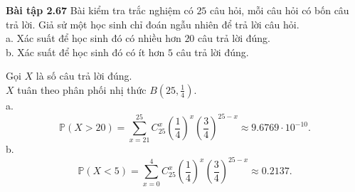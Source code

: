 \documentclass[12pt,a4paper]{article}
\begin{document}
\begin{mybox}
\textbf{Bài tập 2.67} Bài kiểm tra trắc nghiệm có $25$ câu hỏi, mỗi câu hỏi có bốn câu trả lời. Giả sử một học sinh chỉ đoán ngẫu nhiên để trả lời câu hỏi.\\
a. Xác suất để học sinh đó có nhiều hơn $20$ câu trả lời đúng.\\
b. Xác suất để học sinh đó có ít hơn $5$ câu trả lời đúng.\\
\end{mybox}
Gọi $X$ là số câu trả lời đúng.\\
$X$ tuân theo phân phối nhị thức $B \left( {25, \frac{1}{4}} \right).$\\
a. $$\mathbb{P} \left( {X > 20} \right) = \sum\limits_{x = 21}^{25} {C_{25}^x \left( {\frac{1}{4}} \right)^{x} \left( {\frac{3}{4}} \right)^{25 - x}} \approx 9.6769 \cdot 10^{-10}.$$
b. $$\mathbb{P} \left( {X < 5} \right) = \sum\limits_{x = 0}^{4} {C_{25}^x \left( {\frac{1}{4}} \right)^{x} \left( {\frac{3}{4}} \right)^{25 - x}} \approx 0.2137.$$
\end{document}
